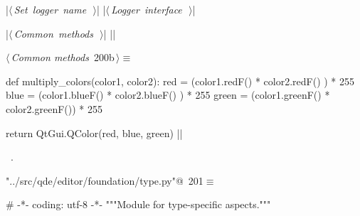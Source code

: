 \documentclass[%
    a4paper,    %
    justified,  %
    nobib,      %
    openany     %
]{tufte-book}
\makeatletter
\renewcommand{\label}[1]{\@tufte@label{##1}}%
\makeatother
\begin{document}
\begin{fullwidth}
\begin{flushleft}
\begin{minipage}{\linewidth}
\begin{pythoncode}
    |\hbox{$\langle\,${\itshape Set logger name}\nobreak\ {\footnotesize {}}$\,\rangle$}|
    |\hbox{$\langle\,${\itshape Logger interface}\nobreak\ {\footnotesize {}}$\,\rangle$}|

|\hbox{$\langle\,${\itshape Common methods}\nobreak\ {\footnotesize {}}$\,\rangle$}|
|\NWsep|
\end{pythoncode}
\vspace{1.5ex}
\footnotesize
\begin{list}{}{\setlength{\itemsep}{-\parsep}\setlength{\itemindent}{-\leftmargin}}

\item{}
\end{list}
\end{minipage}\vspace{4ex}
\end{flushleft}
\begin{flushleft} \small
\begin{minipage}{\linewidth}\label{scrap193}\raggedright\small
{} $\langle\,${\itshape Common methods}\nobreak\ {\footnotesize {200b}}$\,\rangle\equiv$
\vspace{-1ex}
\begin{pythoncode}
def multiply_colors(color1, color2):
    red   = (color1.redF()   * color2.redF()  ) * 255
    blue  = (color1.blueF()  * color2.blueF() ) * 255
    green = (color1.greenF() * color2.greenF()) * 255

    return QtGui.QColor(red, blue, green)
|\NWsep|
\end{pythoncode}
\vspace{1.5ex}
\footnotesize
\begin{list}{}{\setlength{\itemsep}{-\parsep}\setlength{\itemindent}{-\leftmargin}}
\item \NWtxtMacroRefIn\ .

\item{}
\end{list}
\end{minipage}\vspace{4ex}
\end{flushleft}

\begin{flushleft} \small
\begin{minipage}{\linewidth}\label{scrap194}\raggedright\small
{} \verb@"../src/qde/editor/foundation/type.py"@\nobreak\ {\footnotesize {201}}$\equiv$
\vspace{-1ex}
\begin{pythoncode}
# -*- coding: utf-8 -*-
"""Module for type-specific aspects."""


\end{pythoncode}
\end{minipage}
\end{flushleft}
\end{fullwidth}
\end{document}
